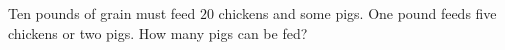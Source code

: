 Ten pounds of grain must feed $20$ chickens and some pigs. One pound feeds five chickens or two pigs. How many pigs can be fed?
